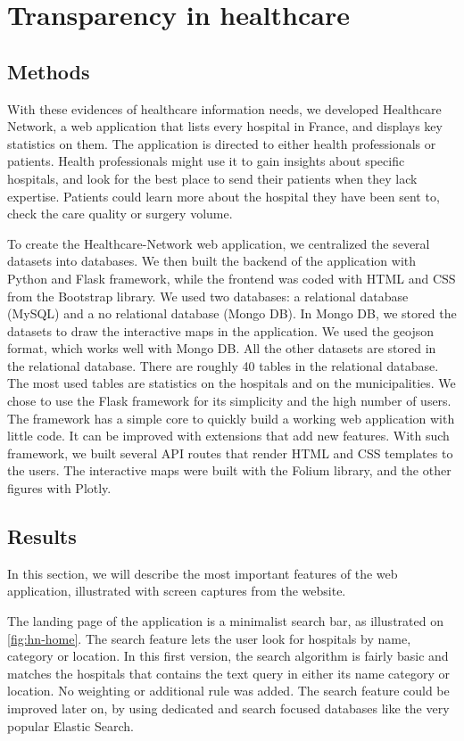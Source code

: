 \chapter{Transparency in healthcare}

\section{Methods}

With these evidences of healthcare information needs, we developed Healthcare
Network, a web application that lists every hospital in France, and displays key
statistics on them. The application is directed to either health professionals
or patients. Health professionals might use it to gain insights about specific
hospitals, and look for the best place to send their patients when they lack
expertise. Patients could learn more about the hospital they have been sent to,
check the care quality or surgery volume.

To create the Healthcare-Network web application, we centralized the several
datasets into databases. We then built the backend of the application with
Python and Flask framework, while the frontend was coded with HTML and CSS from
the Bootstrap library. We used two databases: a relational database (MySQL) and
a no relational database (Mongo DB). In Mongo DB, we stored the datasets to draw
the interactive maps in the application. We used the geojson format, which works
well with Mongo DB. All the other datasets are stored in the relational
database. There are roughly 40 tables in the relational database. The most used
tables are statistics on the hospitals and on the municipalities. We chose to
use the Flask framework for its simplicity and the high number of users. The
framework has a simple core to quickly build a working web application with
little code. It can be improved with extensions that add new features. With such
framework, we built several API routes that render HTML and CSS templates to the
users. The interactive maps were built with the Folium library, and the other
figures with Plotly.

\section{Results}

In this section, we will describe the most important features of the web
application, illustrated with screen captures from the website.

The landing page of the application is a minimalist search bar, as illustrated
on \cref{fig:hn-home}. The search feature lets the user look for hospitals by
name, category or location. In this first version, the search algorithm is
fairly basic and matches the hospitals that contains the text query in either
its name category or location. No weighting or additional rule was added. The
search feature could be improved later on, by using dedicated and search focused
databases like the very popular Elastic Search.

